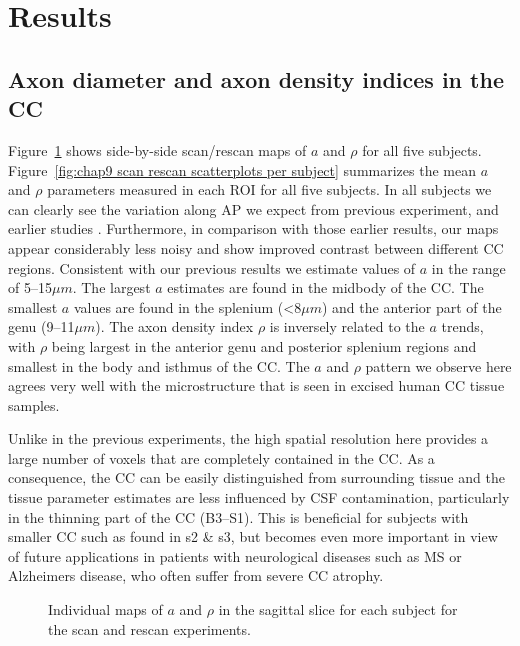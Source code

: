 \FloatBarrier
\section{Results}
\subsection{Axon diameter and axon density indices in the CC}
Figure~\ref{fig:chap9 scan rescan maps per subject} shows side-by-side scan/rescan maps of $a$ and $\rho$ for all five subjects. Figure~\ref{fig:chap9 scan rescan scatterplots per subject} summarizes the mean $a$ and $\rho$ parameters measured in each \gls{ROI} for all five subjects. In all subjects we can clearly see the variation along AP we expect from previous experiment, and earlier studies \citep{Alexander:2010}. Furthermore, in comparison with those earlier results, our maps appear considerably less noisy and show improved contrast between different \gls{CC} regions. Consistent with our previous results we estimate values of $a$ in the range of 5--15$\mu m$. The largest $a$ estimates are found in the midbody of the \gls{CC}. The smallest $a$ values are found in the splenium (<8$\mu m$) and the anterior part of the genu (9--11$\mu m$). The axon density index $\rho$ is inversely related to the $a$ trends, with $\rho$ being largest in the anterior genu and posterior splenium regions and smallest in the body and isthmus of the \gls{CC}. The $a$ and $\rho$ pattern we observe here agrees very well with the microstructure that is seen in excised human \gls{CC} tissue samples\citep{Aboitiz:1992}.


Unlike in the previous experiments, the high spatial resolution here provides a large number of voxels that are completely contained in the \gls{CC}. As a consequence, the \gls{CC} can be easily distinguished from surrounding tissue and the tissue parameter estimates are less influenced by CSF contamination, particularly in the thinning part of the \gls{CC} (B3--S1). This is beneficial for subjects with smaller \gls{CC} such as found in s2 \& s3, but becomes even more important in view of future applications in patients with neurological diseases such as MS or Alzheimers disease, who often suffer from severe \gls{CC} atrophy. 
\begin{figure}[ht]
	\centering
	\caption{Individual maps of $a$ and $\rho$ in the sagittal slice for each subject for the scan and rescan experiments.}
	\label{fig:chap9 scan rescan maps per subject}
\end{figure}

